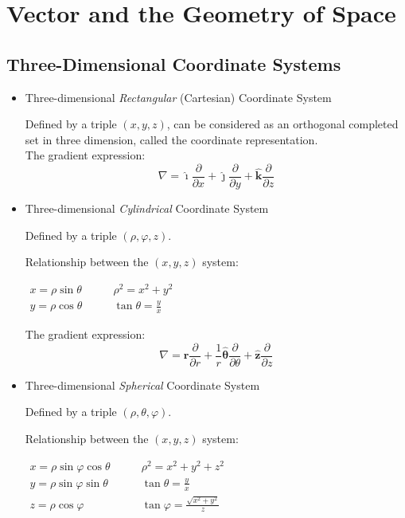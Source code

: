 \chapter{Vector and the Geometry of Space}
\section{Three-Dimensional Coordinate Systems}
\begin{itemize}
\item Three-dimensional \emph{Rectangular} (Cartesian) Coordinate System

Defined by a triple $(x, y, z)$, can be considered as an orthogonal completed set in three dimension, called the coordinate representation. \\

The gradient expression:
\begin{equation}
 \boxed{\nabla = \hat{\bm{\imath}}\frac{\partial }{\partial x}+ \hat{\bm{\jmath}} \frac{\partial }{\partial y}+\hat{\bm{k}}\frac{\partial }{\partial z}	}
\end{equation}

\item Three-dimensional \emph{Cylindrical} Coordinate System

Defined by a triple $(\rho, \varphi, z)$.

Relationship between the $(x, y, z)$ system:
\begin{center}
$\begin{array}{ll}
x = \rho \sin \theta \qquad &  \rho ^2 = x^2+y^2\\
y = \rho \cos \theta \qquad &  \tan \theta = \frac{y}{x}
\end{array}$
\end{center}

The gradient expression:
\begin{equation}
\boxed{\nabla = 
\hat{\bm{r}}\frac{\partial }{\partial r}+
\frac{1}{r} \hat{\bm{\theta}}	\frac{\partial }{\partial \theta}+
\hat{\bm{z}}\frac{\partial }{\partial z}}
\end{equation}

\item Three-dimensional \emph{Spherical} Coordinate System

Defined by a triple $(\rho, \theta, \varphi)$.

Relationship between the $(x, y, z)$ system:
\begin{center}
$\begin{array}{ll}
x = \rho \sin \varphi \cos \theta \qquad &  \rho ^2 = x^2+y^2+z^2\\
y = \rho \sin \varphi \sin \theta \qquad &  \tan \theta = \frac{y}{x}\\
z = \rho \cos \varphi  			\qquad &  \tan \varphi = \frac{\sqrt{x^2+y^2}}{z}
\end{array}$
\end{center}


\end{itemize}
